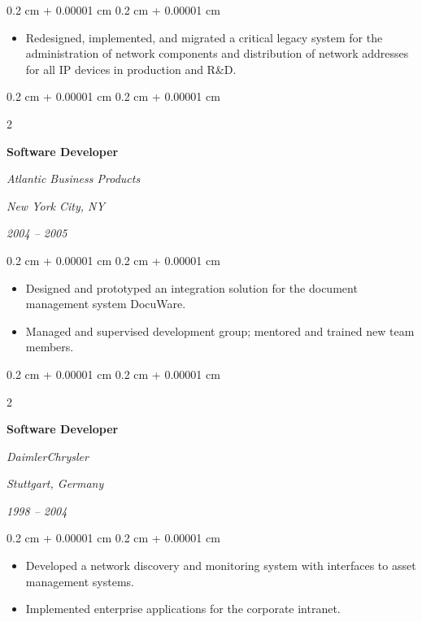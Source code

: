 \documentclass[10pt, a4paper]{article}
\newenvironment{highlights}{
    \begin{itemize}[
        topsep=0.10 cm,
        parsep=0.10 cm,
        partopsep=0pt,
        itemsep=0pt,
        leftmargin=0.4 cm + 10pt
    ]
}{
    \end{itemize}
} %
\newenvironment{onecolentry}{
    \begin{adjustwidth}{
        0.2 cm + 0.00001 cm
    }{
        0.2 cm + 0.00001 cm
    }
}{
    \end{adjustwidth}
} %
\newenvironment{twocolentry}[2][6cm]{ %
    \onecolentry
    \def\secondColumn{#2}
    \setcolumnwidth{\fill, #1} %
    \begin{paracol}{2}
}{
    \switchcolumn \raggedleft \secondColumn
    \end{paracol}
    \endonecolentry
} %
\begin{document}
\vspace{0.10 cm}
\begin{onecolentry}
    \begin{highlights}
        \item Redesigned, implemented, and migrated a critical legacy system for the administration of network components and distribution of network addresses for all IP devices in production and R\&D.
    \end{highlights}
\end{onecolentry}

\vspace{0.20 cm}



%
%
\begin{twocolentry}{
        \textit{New York City, NY}

        \textit{2004 – 2005}}
    \textbf{Software Developer}

    \textit{Atlantic Business Products}
\end{twocolentry}

\vspace{0.10 cm}
\begin{onecolentry}
    \begin{highlights}
        \item Designed and prototyped an integration solution for the document management system DocuWare.
        \item Managed and supervised development group; mentored and trained new team members.
    \end{highlights}
\end{onecolentry}

\vspace{0.20 cm}



%
%
\begin{twocolentry}{
        \textit{Stuttgart, Germany}

        \textit{1998 – 2004}}
    \textbf{Software Developer}

    \textit{DaimlerChrysler}
\end{twocolentry}

\vspace{0.10 cm}
\begin{onecolentry}
    \begin{highlights}
        \item Developed a network discovery and monitoring system with interfaces to asset management systems.
        \item Implemented enterprise applications for the corporate intranet.
    \end{highlights}
\end{onecolentry}
\end{document}
